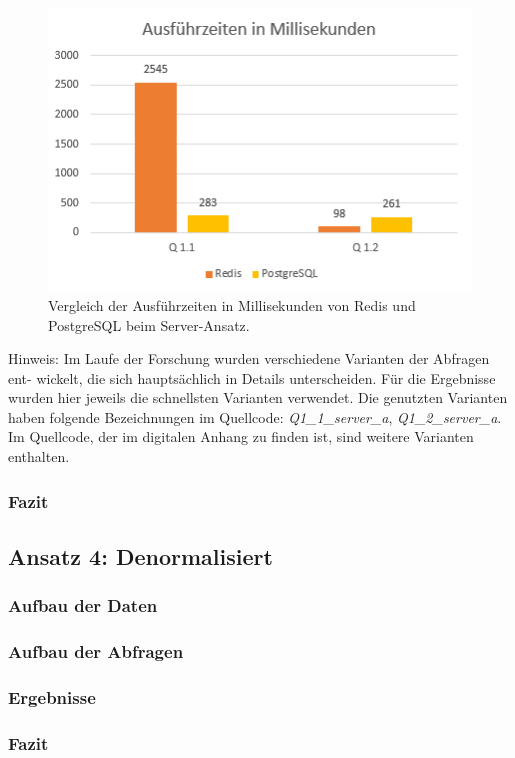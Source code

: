 \begin{figure}[ht]  %
    \centering      %
    \includegraphics[width=1\textwidth]{pictures/results/results-server.png}
    \caption{Vergleich der Ausführzeiten in Millisekunden von Redis und PostgreSQL beim Server-Ansatz.}      %
    \label{pic:results-server}    %
\end{figure}

Hinweis: Im Laufe der Forschung wurden verschiedene Varianten der Abfragen ent-
wickelt, die sich hauptsächlich in Details unterscheiden. Für die Ergebnisse wurden
hier jeweils die schnellsten Varianten verwendet. Die
genutzten Varianten haben folgende Bezeichnungen im Quellcode: \emph{Q1\_1\_server\_a}, \emph{Q1\_2\_server\_a}. Im Quellcode,
der im digitalen Anhang zu finden ist, sind weitere Varianten enthalten.


\subsubsection{Fazit}


\subsection{Ansatz 4: Denormalisiert}
\subsubsection{Aufbau der Daten}
\subsubsection{Aufbau der Abfragen}
\subsubsection{Ergebnisse}
\subsubsection{Fazit}